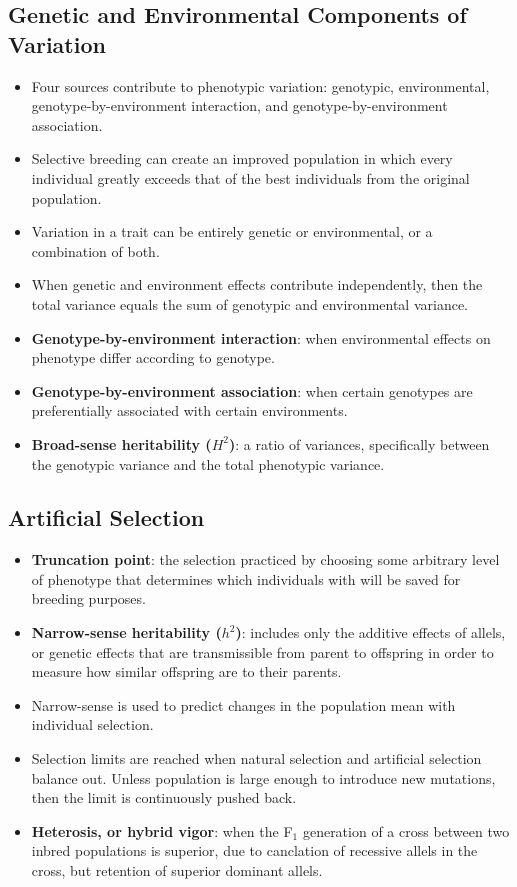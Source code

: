 \documentclass[12pt,a4paper]{article}
\begin{document}
\subsection{Genetic and Environmental Components of Variation}
\begin{itemize}
    \item Four sources contribute to phenotypic variation: genotypic, environmental, genotype-by-environment interaction, and genotype-by-environment association.
    \item Selective breeding can create an improved population in which every individual greatly exceeds that of the best individuals from the original population.
    \item Variation in a trait can be entirely genetic or environmental, or a combination of both.
    \item When genetic and environment effects contribute independently, then the total variance equals the sum of genotypic and environmental variance.
    \item \textbf{Genotype-by-environment interaction}: when environmental effects on phenotype differ according to genotype.
    \item \textbf{Genotype-by-environment association}: when certain genotypes are preferentially associated with certain environments.
    \item \textbf{Broad-sense heritability (\(H^2\))}: a ratio of variances, specifically between the genotypic variance and the total phenotypic variance.
\end{itemize}

\subsection{Artificial Selection}
\begin{itemize}
    \item \textbf{Truncation point}: the selection practiced by choosing some arbitrary level of phenotype that determines which individuals with will be saved for breeding purposes.
    \item \textbf{Narrow-sense heritability (\(h^2\))}: includes only the additive effects of allels, or genetic effects that are transmissible from parent to offspring in order to measure how similar offspring are to their parents.
    \item Narrow-sense is used to predict changes in the population mean with individual selection.
    \item Selection limits are reached when natural selection and artificial selection balance out. Unless population is large enough to introduce new mutations, then the limit is continuously pushed back.
    \item \textbf{Heterosis, or hybrid vigor}: when the F\(_{1}\) generation of a cross between two inbred populations is superior, due to canclation of recessive allels in the cross, but retention of superior dominant allels.
\end{itemize}

\end{document}
